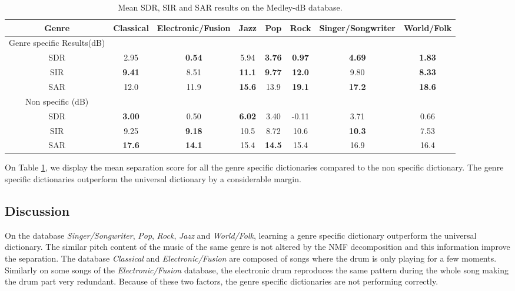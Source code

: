 \documentclass{article}
\begin{document}
\begin{table}
   
   \begin{tabular}{|c|c|c|c|c|c|c|c|}
\hline   
Genre & Classical & Electronic/Fusion & Jazz & Pop & Rock & Singer/Songwriter & World/Folk \\
\hline
Genre specific Results(dB)  & & & & & & & \\
SDR & 2.95     & \bf{0.54}& 5.94     & \bf{3.76}&\bf{0.97} &\bf{4.69} &\bf{1.83} \\
SIR & \bf{9.41}& 8.51     & \bf{11.1}& \bf{9.77}&\bf{12.0} & 9.80     &\bf{8.33} \\
SAR & 12.0     & 11.9     & \bf{15.6}& 13.9     &\bf{19.1} &\bf{17.2} &\bf{18.6} \\
\hline
Non specific (dB) & & & & & & &\\
SDR & \bf{3.00}& 0.50     & \bf{6.02}& 3.40     & -0.11    &  3.71    & 0.66 \\
SIR & 9.25     & \bf{9.18}& 10.5     & 8.72     & 10.6     &\bf{10.3} & 7.53 \\
SAR & \bf{17.6}& \bf{14.1}& 15.4     & \bf{14.5}& 15.4     & 16.9     & 16.4 \\
\hline
  \end{tabular} 
\caption{\label{specresults} Mean SDR, SIR and SAR results on the Medley-dB database.}
\end{table}



On Table \ref{specresults}, we display the mean separation score for all the genre specific dictionaries compared to the non specific dictionary. The genre specific dictionaries outperform the universal dictionary by a considerable margin.


\subsection{Discussion}


On the database \emph{Singer/Songwriter}, \emph{Pop}, \emph{Rock}, \emph{Jazz} and \emph{World/Folk}, learning a genre specific dictionary outperform the universal dictionary. The similar pitch content of the music of the same genre is not altered by the NMF decomposition and this information improve the separation.  
The database \emph{Classical} and \emph{Electronic/Fusion} are composed of songs where the drum is only playing for a few moments. Similarly on some songs of the \emph{Electronic/Fusion} database, the electronic drum reproduces the same pattern during the whole song making the drum part very redundant. Because of these two factors, the genre specific dictionaries are not performing correctly.
\end{document}
